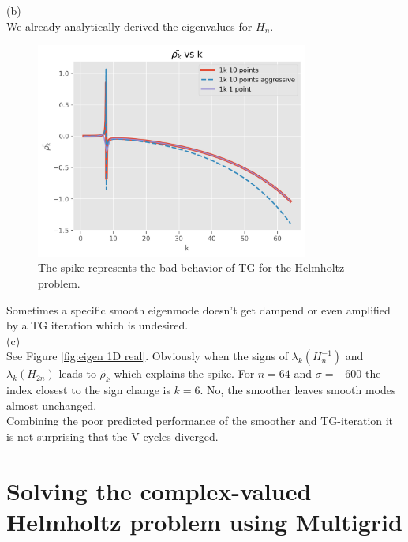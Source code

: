\documentclass[a4paper,12pt]{article}
\begin{document}
(b) \\
We already analytically derived the eigenvalues for $H_{n}$.
\begin{figure}[h!]
    \centering
    \includegraphics[width=0.8\textwidth]{../code/plts/rho_k_1DrealG.png}
    \caption{The spike represents the bad behavior of TG for the Helmholtz problem.}
    \label{fig:rho_k vs k real}
\end{figure}

Sometimes a specific smooth eigenmode doesn't get dampend or even amplified by a TG iteration which is undesired. \\
(c)\\
See Figure \ref{fig:eigen 1D real}.  Obviously when the signs of $\lambda_{k}(H_{n}^{-1})$  and $\lambda_{k}(H_{2n})$
leads to $\tilde{\rho_k}$ which explains the spike. For $n = 64$ and $\sigma= -600$ the
index closest to the sign change is $k = 6$. No, the smoother leaves smooth modes almost unchanged.\\

Combining the poor predicted performance of the smoother and TG-iteration it is not
surprising that the V-cycles diverged.


\section{Solving the complex-valued Helmholtz problem using Multigrid}
\end{document}
